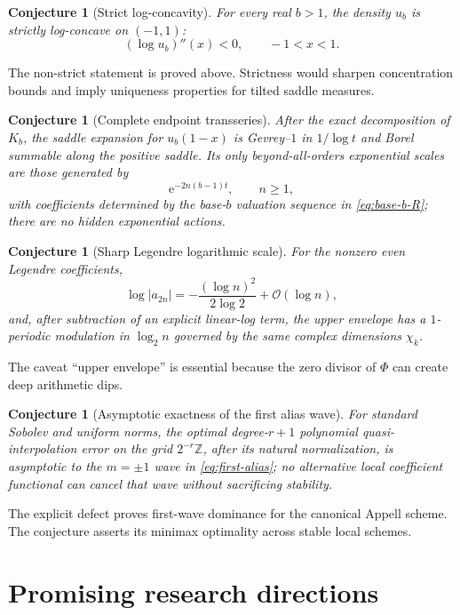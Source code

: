 \documentclass[11pt,oneside]{article}
\newtheorem{conjecture}[theorem]{Conjecture}
\theoremstyle{definition}
\theoremstyle{remark}
\newcommand{\Z}{\mathbb Z}
\newcommand{\e}{\mathrm e}
\newcommand{\bigO}{\mathcal O}
\begin{document}
\begin{conjecture}[Strict log-concavity]
\label{conj:strict-logconcavity}
For every real \(b>1\), the density \(u_b\) is strictly log-concave on
\((-1,1)\):
\[
 (\log u_b)''(x)<0,\qquad -1<x<1.
\]
\end{conjecture}

The non-strict statement is proved above.  Strictness would sharpen
concentration bounds and imply uniqueness properties for tilted saddle
measures.

\begin{conjecture}[Complete endpoint transseries]
\label{conj:resurgence}
After the exact decomposition of \(K_b\), the saddle expansion for
\(u_b(1-x)\) is Gevrey--\(1\) in \(1/\log t\) and Borel summable along the
positive saddle.  Its only beyond-all-orders exponential scales are those
generated by
\[
 \e^{-2n(b-1)t},\qquad n\geq1,
\]
with coefficients determined by the base-\(b\) valuation sequence in
\eqref{eq:base-b-R}; there are no hidden exponential actions.
\end{conjecture}

\begin{conjecture}[Sharp Legendre logarithmic scale]
\label{conj:legendre-sharp}
For the nonzero even Legendre coefficients,
\[
 \log|a_{2n}|
 =-\frac{(\log n)^2}{2\log2}+\bigO(\log n),
\]
and, after subtraction of an explicit linear-log term, the upper envelope has
a \(1\)-periodic modulation in \(\log_2n\) governed by the same complex
dimensions \(\chi_k\).
\end{conjecture}

The caveat ``upper envelope'' is essential because the zero divisor of
\(\Phi\) can create deep arithmetic dips.

\begin{conjecture}[Asymptotic exactness of the first alias wave]
\label{conj:alias-norm}
For standard Sobolev and uniform norms, the optimal degree-\(r+1\)
polynomial quasi-interpolation error on the grid \(2^{-r}\Z\), after its
natural normalization, is asymptotic to the \(m=\pm1\) wave in
\eqref{eq:first-alias}; no alternative local coefficient functional can
cancel that wave without sacrificing stability.
\end{conjecture}

The explicit defect proves first-wave dominance for the canonical Appell
scheme.  The conjecture asserts its minimax optimality across stable local
schemes.

\section{Promising research directions}
\label{sec:future}
\end{document}
